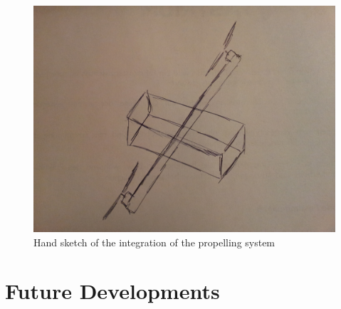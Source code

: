 \begin{figure}[bht]
\centering
\includegraphics[width=\textwidth]{figures/prop.jpg}
\caption{Hand sketch of the integration of the propelling system}
\label{fig:prop}
\end{figure}

\section{Future Developments}

